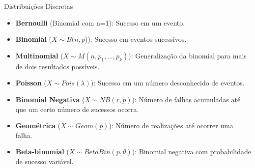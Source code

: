 \documentclass{beamer}\usepackage[]{graphicx}\usepackage[]{color}
\begin{document}
% 
% 
%   
% 
% 
% 
% 
% 
% 
% 
% 
% 

\begin{frame}{Distribuições Discretas}

\begin{small}

\begin{itemize}
  \item \textbf{Bernoulli} (Binomial com n=1): Sucesso em um evento.
    \vfill
  \item \textbf{Binomial} ($X \sim B(n,p$)): Sucesso em eventos sucessivos.
    \vfill
  \item \textbf{Multinomial} ($X \sim M(n,p_1,\dots,p_k)$): Generalização da binomial para mais de dois resultados possíveis.
    \vfill
  \item \textbf{Poisson} ($X \sim Pois(\lambda)$): Sucesso em um número desconhecido de eventos.
    \vfill
  \item \textbf{Binomial Negativa }($X \sim NB(r,p)$): Número de falhas acumuladas até que um certo número de sucessos ocorra.
    \vfill
  \item \textbf{Geométrica} ($X \sim Geom(p)$): Número de realizações até ocorrer uma falha.
    \vfill
  \item \textbf{Beta-binomial }($X \sim BetaBin(p,\theta)$): Binomial negativa com probabilidade de sucesso variável.
\end{itemize}

\end{small}

\end{frame} 
\end{document}
